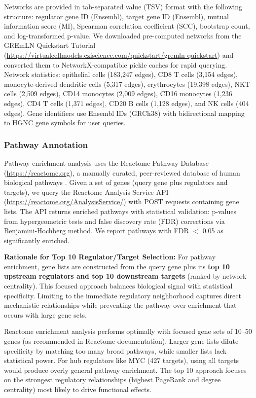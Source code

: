 \documentclass[11pt]{article}
\begin{document}
Networks are provided in tab-separated value (TSV) format with the following structure: regulator gene ID (Ensembl), target gene ID (Ensembl), mutual information score (MI), Spearman correlation coefficient (SCC), bootstrap count, and log-transformed p-value. We downloaded pre-computed networks from the GREmLN Quickstart Tutorial (\url{https://virtualcellmodels.cziscience.com/quickstart/gremln-quickstart}) and converted them to NetworkX-compatible pickle caches for rapid querying. Network statistics: epithelial cells (183,247 edges), CD8 T cells (3,154 edges), monocyte-derived dendritic cells (5,317 edges), erythrocytes (19,398 edges), NKT cells (2,509 edges), CD14 monocytes (2,009 edges), CD16 monocytes (1,236 edges), CD4 T cells (1,371 edges), CD20 B cells (1,128 edges), and NK cells (404 edges). Gene identifiers use Ensembl IDs (GRCh38) with bidirectional mapping to HGNC gene symbols for user queries.

\subsubsection{Pathway Annotation}

Pathway enrichment analysis uses the Reactome Pathway Database (\url{https://reactome.org}), a manually curated, peer-reviewed database of human biological pathways \cite{reactome2022}. Given a set of genes (query gene plus regulators and targets), we query the Reactome Analysis Service API (\url{https://reactome.org/AnalysisService/}) with POST requests containing gene lists. The API returns enriched pathways with statistical validation: p-values from hypergeometric tests and false discovery rate (FDR) corrections via Benjamini-Hochberg method. We report pathways with FDR $<$ 0.05 as significantly enriched.

\textbf{Rationale for Top 10 Regulator/Target Selection:}
For pathway enrichment, gene lists are constructed from the query gene plus its \textbf{top 10 upstream regulators and top 10 downstream targets} (ranked by network centrality). This focused approach balances biological signal with statistical specificity. Limiting to the immediate regulatory neighborhood captures direct mechanistic relationships while preventing the pathway over-enrichment that occurs with large gene sets.

Reactome enrichment analysis performs optimally with focused gene sets of 10--50 genes (as recommended in Reactome documentation). Larger gene lists dilute specificity by matching too many broad pathways, while smaller lists lack statistical power. For hub regulators like MYC (427 targets), using all targets would produce overly general pathway enrichment. The top 10 approach focuses on the strongest regulatory relationships (highest PageRank and degree centrality) most likely to drive functional effects.
\end{document}

